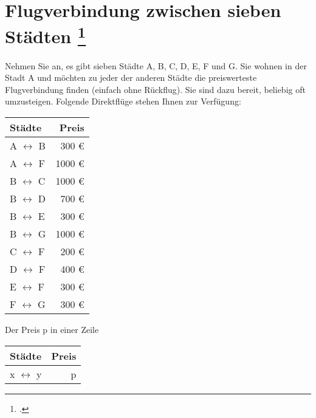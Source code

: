 \documentclass{bschlangaul-aufgabe}
\begin{document}

\section{Flugverbindung zwischen sieben Städten
\footcite[Seite 1, Aufgabe 1: Dijkstra]{aud:ab:6}}

Nehmen Sie an, es gibt sieben Städte A, B, C, D, E, F und G. Sie wohnen
in der Stadt A und möchten zu jeder der anderen Städte die preiswerteste
Flugverbindung finden (einfach ohne Rückflug). Sie sind dazu bereit,
beliebig oft umzusteigen. Folgende Direktflüge stehen Ihnen zur
Verfügung:

\begin{center}
\begin{tabular}{l|r}
Städte & Preis \\\hline
A $\leftrightarrow$ B & 300 € \\
A $\leftrightarrow$ F & 1000 € \\
B $\leftrightarrow$ C & 1000 € \\
B $\leftrightarrow$ D & 700 € \\
B $\leftrightarrow$ E & 300 € \\
B $\leftrightarrow$ G & 1000 € \\
C $\leftrightarrow$ F & 200 € \\
D $\leftrightarrow$ F & 400 € \\
E $\leftrightarrow$ F & 300 € \\
F $\leftrightarrow$ G & 300 € \\
\end{tabular}
\end{center}

\noindent
Der Preis p in einer Zeile

\begin{center}
\begin{tabular}{l|r}
Städte & Preis \\\hline
x $\leftrightarrow$ y & p \\
\end{tabular}
\end{center}
\end{document}

